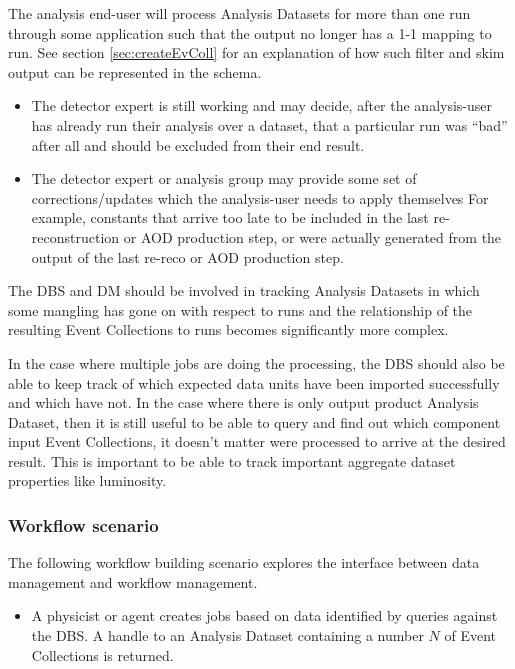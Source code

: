 \documentclass[pdftex]{cmspaper}
\begin{document}
{  The analysis end-user will process Analysis Datasets for more
than one run through some application such that the output no longer has
a 1-1 mapping to run. See section \ref{sec:createEvColl} for an 
explanation of how such filter and skim output can be 
represented in the schema.
\begin{itemize}
\item The detector expert is still working and may decide, after the 
     analysis-user has already run their analysis over a dataset, that a
     particular run was ``bad'' after all and should be excluded from their
     end result. 
\item The detector expert or analysis group may provide some set of
     corrections/updates which the analysis-user needs to apply themselves
     For example, constants that arrive too late to be included in 
     the last re-reconstruction or AOD production step, or were 
     actually generated from the output of
     the last re-reco or AOD production step. 
\end{itemize}
The DBS and DM should be involved in tracking Analysis Datasets in which
some mangling has gone on with respect to runs and the relationship of 
the resulting Event Collections to runs becomes significantly more complex.

In the case where multiple jobs are doing the processing, the DBS should
also be able to keep track of which expected data units have been imported
successfully and which have not.  In the case where there is only output
product Analysis Dataset, then it is still useful to be able to query
and find out which component input Event Collections, it doesn't matter
were processed to arrive at the desired result.  This is important to
be able to track important aggregate dataset properties like luminosity.

\subsubsection{Workflow scenario}

The following workflow building scenario explores the 
interface between data management and workflow management.

\begin{itemize}

\item A physicist or agent creates jobs based on data identified by queries against 
the DBS.  A handle to an Analysis Dataset containing a number $N$ of
Event Collections is returned.  


\end{itemize}}
\end{document}
